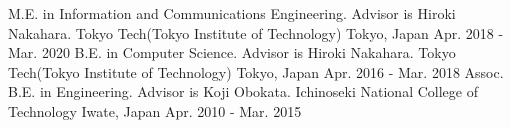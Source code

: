 \begin{cventries}
  \eduentry
    {M.E. in Information and Communications Engineering. Advisor is Hiroki Nakahara.} %
    {Tokyo Tech(Tokyo Institute of Technology)} %
    {Tokyo, Japan} %
    {Apr. 2018 - Mar. 2020} %
  \eduentry
    {B.E. in Computer Science. Advisor is Hiroki Nakahara.} %
    {Tokyo Tech(Tokyo Institute of Technology)} %
    {Tokyo, Japan} %
    {Apr. 2016 - Mar. 2018} %
  \eduentry
    {Assoc. B.E. in Engineering. Advisor is Koji Obokata.} %
    {Ichinoseki National College of Technology} %
    {Iwate, Japan} %
    {Apr. 2010 - Mar. 2015} %
\end{cventries}
